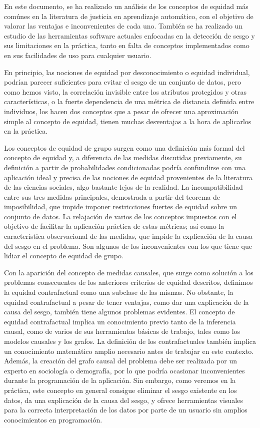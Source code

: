 \documentclass[oneside,openright,titlepage,numbers=noenddot,openany,headinclude,footinclude=true,
cleardoublepage=empty,abstractoff,BCOR=5mm,paper=a4,fontsize=12pt,main=spanish]{scrreprt}
\begin{document}
En este documento, se ha realizado un análisis de los conceptos de equidad más comúnes en la literatura de justicia en aprendizaje automático, con el objetivo de valorar las ventajas e inconvenientes de cada uno. También se ha realizado un estudio de las herramientas software actuales enfocadas en la detección de sesgo y sus limitaciones en la práctica, tanto en falta de conceptos implementados como en sus facilidades de uso para cualquier usuario.

En principio, las nociones de equidad por desconocimiento o equidad individual, podrían parecer suficientes para evitar el sesgo de un conjunto de datos, pero como hemos visto, la correlación invisible entre los atributos protegidos y otras características, o la fuerte dependencia de una métrica de distancia definida entre individuos, los hacen dos conceptos que a pesar de ofrecer una aproximación simple al concepto de equidad, tienen muchas desventajas a la hora de aplicarlos en la práctica.

Los conceptos de equidad de grupo surgen como una definición más formal del concepto de equidad y, a diferencia de las medidas discutidas previamente, su definición a partir de probabilidades condicionadas podría confundirse con una aplicación ideal y precisa de las nociones de equidad provenientes de la literatura de las ciencias sociales, algo bastante lejos de la realidad. La incompatibilidad entre sus tres medidas principales, demostrada a partir del teorema de imposibilidad, que impide imponer restricciones fuertes de equidad sobre un conjunto de datos. La relajación de varios de los conceptos impuestos con el objetivo de facilitar la aplicación práctica de estas métricas; así como la característica observacional de las medidas, que impide la explicación de la causa del sesgo en el problema. Son algunos de los inconvenientes con los que tiene que lidiar el concepto de equidad de grupo.

\clearpage

Con la aparición del concepto de medidas causales, que surge como solución a los problemas consecuentes de los anteriores criterios de equidad descritos, definimos la equidad contrafactual como una subclase de las mismas. No obstante, la equidad contrafactual a pesar de tener ventajas, como dar una explicación de la causa del sesgo, también tiene algunos problemas evidentes. El concepto de equidad contrafactual implica un conocimiento previo tanto de la inferencia causal, como de varios de sus herramientas básicas de trabajo, tales como los modelos causales y los grafos. La definición de los contrafactuales también implica un conocimiento matemático amplio necesario antes de trabajar en este contexto. Además, la creación del grafo causal del problema debe ser realizada por un experto en sociología o demografía, por lo que podría ocasionar inconvenientes durante la programación de la aplicación. Sin embargo, como veremos en la práctica, este concepto en general consigue eliminar el sesgo existente en los datos, da una explicación de la causa del sesgo, y ofrece herramientas visuales para la correcta interpretación de los datos por parte de un usuario sin amplios conocimientos en programación.
\end{document}
